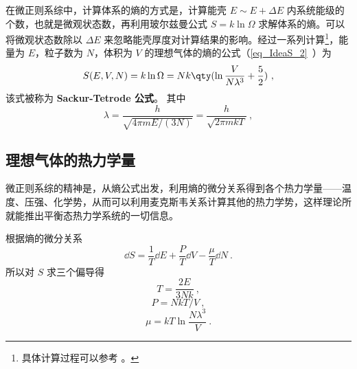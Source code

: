 
\begin{issues}
\issueDraft
\end{issues}


在微正则系综中，计算体系的熵的方式是，计算能壳 $E\sim E+\Delta E$ 内系统能级的个数，也就是微观状态数，再利用玻尔兹曼公式 $S=k\ln \Omega$ 求解体系的熵。可以将微观状态数除以 $\Delta E$ 来忽略能壳厚度对计算结果的影响。经过一系列计算\footnote{具体计算过程可以参考 。}，能量为 $E$，粒子数为 $N$，体积为 $V$ 的理想气体的熵的公式（\autoref{eq_IdeaS_2}~）为
\begin{equation}\label{eq_IdNCE_1}
S(E, V, N) = k\ln \Omega  = Nk \qty(\ln \frac{V}{N\lambda^3} + \frac52)~,
\end{equation}
该式被称为 \textbf{Sackur-Tetrode 公式}。 其中
\begin{equation}\label{eq_IdNCE_2}
\lambda = \frac{h}{\sqrt{4\pi mE/(3N)}} = \frac{h}{\sqrt{2\pi mkT}}~,
\end{equation}

\subsection{理想气体的热力学量}
微正则系综的精神是，从熵公式出发，利用熵的微分关系得到各个热力学量——温度、压强、化学势，从而可以利用麦克斯韦关系计算其他的热力学势，这样理论所就能推出平衡态热力学系统的一切信息。

根据熵的微分关系
\begin{equation}
\dd{S} = \frac{1}{T} \dd{E} + \frac{P}{T} \dd{V} - \frac{\mu}{T} \dd{N}~.
\end{equation}
所以对 $S$ 求三个偏导得
\begin{equation}
T = \frac{2E}{3Nk}~,
\end{equation}
\begin{equation}
P = NkT/V~,
\end{equation}
\begin{equation}
\mu = kT \ln \frac{N\lambda^3}{V}~.
\end{equation}
